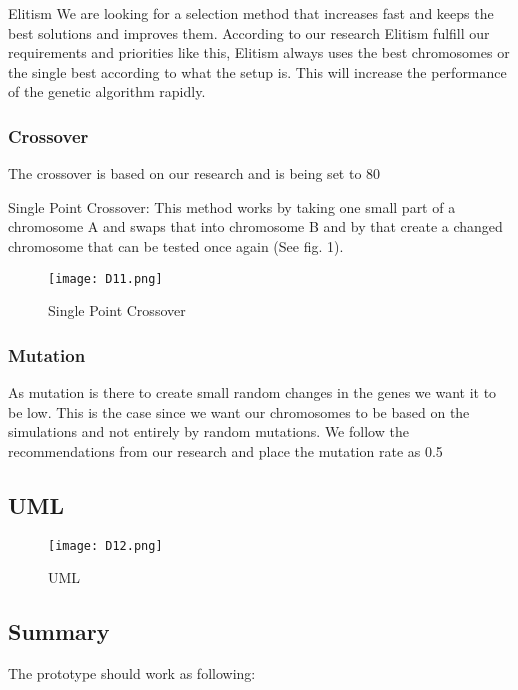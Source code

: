 Elitism
We are looking for a selection method that increases fast and keeps the best solutions and improves them. According to our research Elitism fulfill our requirements and priorities like this, Elitism always uses the best chromosomes or the single best according to what the setup is. This will increase the performance of the genetic algorithm rapidly.

\subsubsection{Crossover}
The crossover is based on our research and is being set to 80%

Single Point Crossover:
This method works by taking one small part of a chromosome A and swaps that into chromosome B and by that create a changed chromosome that can be tested once again (See fig. 1).


\begin{figure}[!htbp]
\centering
\texttt{[image: D11.png]}
\caption{ Single Point Crossover }
\label{fig:Crossover}
\end{figure}


\subsubsection{Mutation}
As mutation is there to create small random changes in the genes we want it to be low. This is the case since we want our chromosomes to be based on the simulations and not entirely by random mutations. We follow the recommendations from our research and place the mutation rate as 0.5%

\subsection{UML}

\begin{figure}[!htbp]
\centering
\texttt{[image: D12.png]}
\caption{ UML }
\label{fig:UML}
\end{figure}

\subsection{Summary}

The prototype should work as following:

